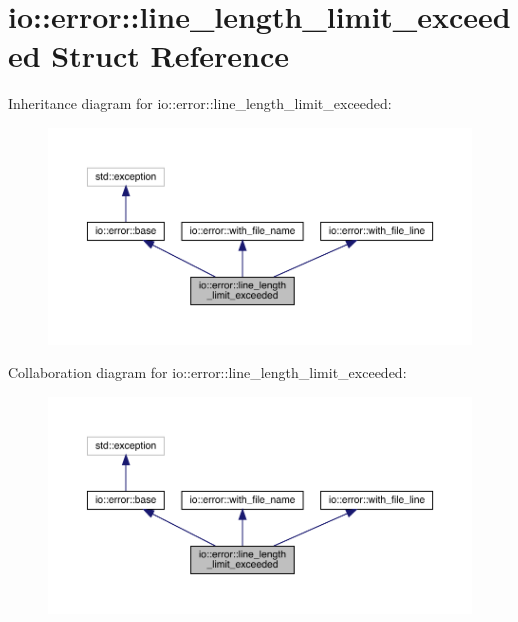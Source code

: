 \hypertarget{structio_1_1error_1_1line__length__limit__exceeded}{}\section{io\+:\+:error\+:\+:line\+\_\+length\+\_\+limit\+\_\+exceeded Struct Reference}
\label{structio_1_1error_1_1line__length__limit__exceeded}


Inheritance diagram for io\+:\+:error\+:\+:line\+\_\+length\+\_\+limit\+\_\+exceeded\+:
\nopagebreak
\begin{figure}[H]
\begin{center}
\leavevmode
\includegraphics[width=350pt]{structio_1_1error_1_1line__length__limit__exceeded__inherit__graph}
\end{center}
\end{figure}


Collaboration diagram for io\+:\+:error\+:\+:line\+\_\+length\+\_\+limit\+\_\+exceeded\+:
\nopagebreak
\begin{figure}[H]
\begin{center}
\leavevmode
\includegraphics[width=350pt]{structio_1_1error_1_1line__length__limit__exceeded__coll__graph}
\end{center}
\end{figure}
